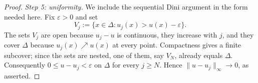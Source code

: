 \begin{proof}
\emph{Step 5: uniformity.}
We include the sequential Dini argument in the form needed here.  Fix
\(\varepsilon>0\) and set
\[
 V_j:=\{x\in\Delta:u_j(x)>u(x)-\varepsilon\}.
\]
The sets \(V_j\) are open because \(u_j-u\) is continuous, they increase
with \(j\), and they cover \(\Delta\) because \(u_j(x)\nearrow u(x)\) at
every point.  Compactness gives a finite subcover; since the sets are nested,
one of them, say \(V_N\), already equals \(\Delta\).  Consequently
\(0\leq u-u_j<\varepsilon\) on \(\Delta\) for every \(j\geq N\).  Hence
\(\|u-u_j\|_\infty\to0\), as asserted.
\end{proof}
